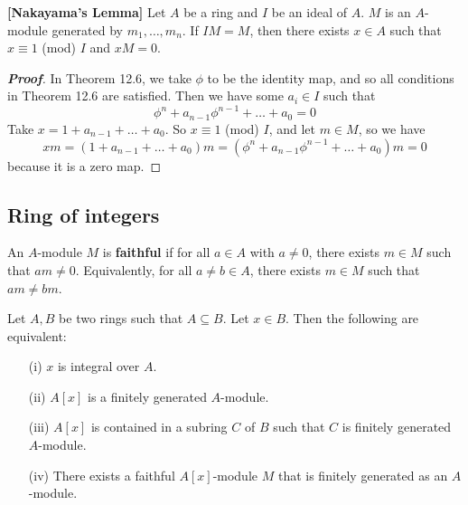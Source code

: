 \begin{corollary}{\bf [Nakayama's Lemma]}\label{N;Nakayama} Let $A$ be a ring and $I$ be an ideal of $A$. $M$ is an
$A$-module generated by $m_1,\ldots,m_n$. If $IM=M$, then there exists $x \in A$ such that
$x \equiv 1$ (mod) $I$ and $xM=0$.
\end{corollary}
\begin{proof}[\bf Proof] In Theorem 12.6, we take $\phi$ to be the identity map, and so all conditions in Theorem 12.6 are satisfied. Then we have some $a_i \in I$ such that
$$\phi^n+a_{n-1}\phi^{n-1}+\ldots+a_0=0$$
Take $x=1+a_{n-1}+\ldots+a_0$. So $x \equiv 1$ (mod) $I$, and let $m \in M$, so we have
$$xm=(1+a_{n-1}+\ldots+a_0)m=(\phi^n+a_{n-1}\phi^{n-1}+\ldots+a_0)m =0$$ because it is a zero map.
\end{proof}
\subsection{Ring of integers}
\begin{definition} An $A$-module $M$ is {\bf faithful} if for all $a \in A$ with $a \neq 0$, there exists $m \in M$ such that $am \neq 0$. Equivalently, for all $a \neq b \in A$, there exists $m \in M$ such that $am \neq bm$.
\end{definition}
\begin{lemma} Let $A,B$ be two rings such that $A \subseteq B$. Let $x \in B$. Then the following are equivalent:
\begin{enumerate}
\item[(i)] $x$ is integral over $A$.
\item[(ii)] $A[x]$ is a finitely generated $A$-module.
\item[(iii)] $A[x]$ is contained in a subring $C$ of $B$ such that $C$ is finitely generated $A$-module.
\item[(iv)] There exists a faithful $A[x]$-module $M$ that is finitely generated as an $A$-module.
\end{enumerate}
\end{lemma}
